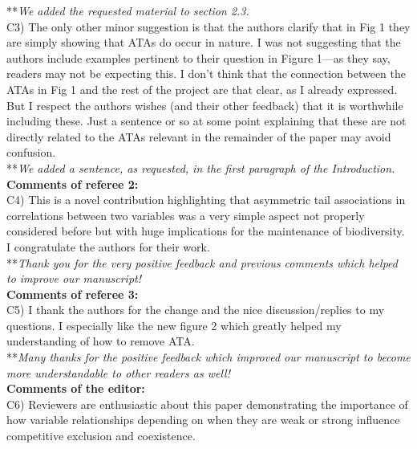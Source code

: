 \documentclass[letterpaper,11pt]{article}
\begin{document}
\noindent ***\emph{We added the requested material to section 2.3.} \\

\noindent C3) The only other minor suggestion is that the authors clarify that in Fig 1 they are simply showing that ATAs do occur in nature.  I was not suggesting that the authors include examples pertinent to their question in Figure 1---as they say, readers may not be expecting this. I don't think that the connection between the ATAs in Fig 1 and the rest of the project are that clear, as I already expressed. But I respect the authors wishes (and their other feedback) that it is worthwhile including these. Just a sentence or so at some point explaining that these are not directly related to the ATAs relevant in the remainder of the paper may avoid confusion. \\

\noindent ***\emph{We added a sentence, as requested, in the first paragraph of the Introduction.} \\

\noindent \textbf{Comments of referee 2:} \\

\noindent C4) This is a novel contribution highlighting that asymmetric tail associations in correlations between two variables was a very simple aspect not properly considered before but with huge implications for the maintenance of biodiversity. I congratulate the authors for their work. \\

\noindent ***\emph{Thank you for the very positive feedback and previous comments which helped to improve our manuscript!} \\

\noindent \textbf{Comments of referee 3:} \\

\noindent C5) I thank the authors for the change and the nice discussion/replies to my questions. I especially like the new figure 2 which greatly helped my understanding of how to remove ATA. \\
  
\noindent ***\emph{Many thanks for the positive feedback which improved our manuscript to become more understandable to other readers as well!} \\

\noindent \textbf{Comments of the editor:} \\

\noindent C6) Reviewers are enthusiastic about this paper demonstrating the importance of how variable relationships depending on when they are weak or strong influence competitive exclusion and coexistence. \\
\end{document}
